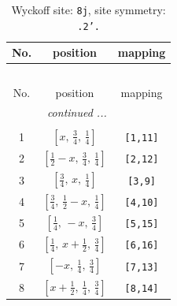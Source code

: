 \documentclass[fleqn,8pt]{jsarticle}
\begin{document}
\begin{longtable}{ccc}
\caption{Wyckoff site: {\tt 8j}, site symmetry: {\tt .2'.}}
 \\
 \hline \hline
No. & position & mapping \\ \hline \endfirsthead

\multicolumn{2}{l}{\tablename\ \thetable{}} \\
 \hline \hline
No. & position & mapping \\ \hline \endhead

 \hline \hline
\multicolumn{2}{r}{\footnotesize\it continued ...} \\ \endfoot

 \hline \hline
\multicolumn{2}{r}{} \\ \endlastfoot

1 & $\left[ x,\, \frac{3}{4},\, \frac{1}{4} \right]$ & {\tt [1,11]} \\ \hline
2 & $\left[ \frac{1}{2} - x,\, \frac{3}{4},\, \frac{1}{4} \right]$ & {\tt [2,12]} \\ \hline
3 & $\left[ \frac{3}{4},\, x,\, \frac{1}{4} \right]$ & {\tt [3,9]} \\ \hline
4 & $\left[ \frac{3}{4},\, \frac{1}{2} - x,\, \frac{1}{4} \right]$ & {\tt [4,10]} \\ \hline
5 & $\left[ \frac{1}{4},\, - x,\, \frac{3}{4} \right]$ & {\tt [5,15]} \\ \hline
6 & $\left[ \frac{1}{4},\, x + \frac{1}{2},\, \frac{3}{4} \right]$ & {\tt [6,16]} \\ \hline
7 & $\left[ - x,\, \frac{1}{4},\, \frac{3}{4} \right]$ & {\tt [7,13]} \\ \hline
8 & $\left[ x + \frac{1}{2},\, \frac{1}{4},\, \frac{3}{4} \right]$ & {\tt [8,14]} \\
\end{longtable}
\renewcommand{\arraystretch}{1.2}
\end{document}
